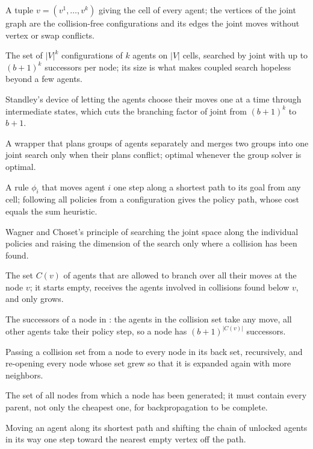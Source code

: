 \item[Joint configuration] A tuple $v = (v^1, \dots, v^k)$ giving the cell of every agent; the vertices of the joint graph are the collision-free configurations and its edges the joint moves without vertex or swap conflicts.
\item[Joint state space] The set of $|V|^k$ configurations of $k$ agents on $|V|$ cells, searched by joint \astar with up to $(b+1)^k$ successors per node; its size is what makes coupled search hopeless beyond a few agents.
\item[Operator decomposition] Standley's device of letting the agents choose their moves one at a time through intermediate states, which cuts the branching factor of joint \astar from $(b+1)^k$ to $b+1$.
\item[Independence detection] A wrapper that plans groups of agents separately and merges two groups into one joint search only when their plans conflict; optimal whenever the group solver is optimal.
\item[Individual policy] A rule $\phi_i$ that moves agent $i$ one step along a shortest path to its goal from any cell; following all policies from a configuration gives the policy path, whose cost equals the sum heuristic.
\item[Subdimensional expansion] Wagner and Choset's principle of searching the joint space along the individual policies and raising the dimension of the search only where a collision has been found.
\item[Collision set] The set $C(v)$ of agents that are allowed to branch over all their moves at the node $v$; it starts empty, receives the agents involved in collisions found below $v$, and only grows.
\item[Limited neighbors] The successors of a node in \mstar: the agents in the collision set take any move, all other agents take their policy step, so a node has $(b+1)^{|C(v)|}$ successors.
\item[Backpropagation (of collision sets)] Passing a collision set from a node to every node in its back set, recursively, and re-opening every node whose set grew so that it is expanded again with more neighbors.
\item[Back set] The set of all nodes from which a node has been generated; it must contain every parent, not only the cheapest one, for backpropagation to be complete.
\item[Push (primitive)] Moving an agent along its shortest path and shifting the chain of unlocked agents in its way one step toward the nearest empty vertex off the path.

